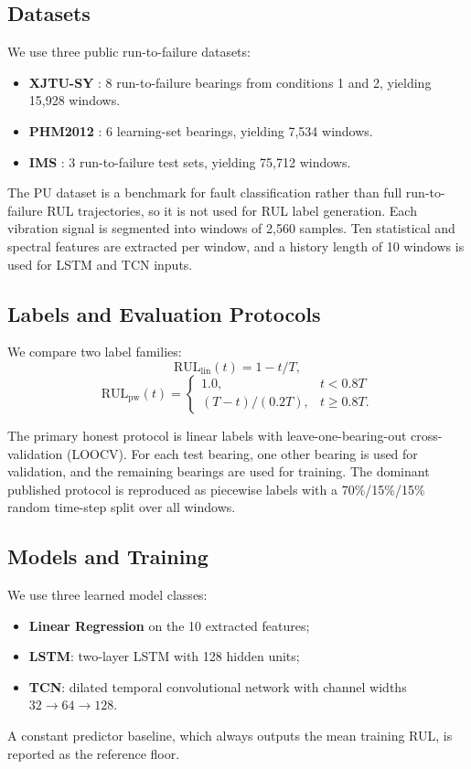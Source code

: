 \documentclass[5p,twocolumn]{elsarticle}
\begin{document}
\subsection{Datasets}
We use three public run-to-failure datasets:
\begin{itemize}
    \item \textbf{XJTU-SY} \cite{xjtusy2019dataset}: 8 run-to-failure bearings from conditions 1 and 2, yielding 15,928 windows.
    \item \textbf{PHM2012} \cite{nectoux2012pronostia}: 6 learning-set bearings, yielding 7,534 windows.
    \item \textbf{IMS} \cite{ims2006}: 3 run-to-failure test sets, yielding 75,712 windows.
\end{itemize}
The PU dataset is a benchmark for fault classification rather than full run-to-failure RUL trajectories, so it is not used for RUL label generation. Each vibration signal is segmented into windows of 2,560 samples. Ten statistical and spectral features are extracted per window, and a history length of 10 windows is used for LSTM and TCN inputs.

\subsection{Labels and Evaluation Protocols}
We compare two label families:
\begin{equation}
\text{RUL}_{\text{lin}}(t) = 1 - t/T,
\label{eq:linear}
\end{equation}
\begin{equation}
\text{RUL}_{\text{pw}}(t) =
\begin{cases}
1.0, & t < 0.8T \\
(T - t)/(0.2T), & t \geq 0.8T.
\end{cases}
\label{eq:piecewise}
\end{equation}

The primary honest protocol is linear labels with leave-one-bearing-out cross-validation (LOOCV). For each test bearing, one other bearing is used for validation, and the remaining bearings are used for training. The dominant published protocol is reproduced as piecewise labels with a 70\%/15\%/15\% random time-step split over all windows.

\subsection{Models and Training}
We use three learned model classes:
\begin{itemize}
    \item \textbf{Linear Regression} on the 10 extracted features;
    \item \textbf{LSTM}: two-layer LSTM with 128 hidden units;
    \item \textbf{TCN}: dilated temporal convolutional network with channel widths $32 \to 64 \to 128$.
\end{itemize}
A constant predictor baseline, which always outputs the mean training RUL, is reported as the reference floor.
\end{document}
